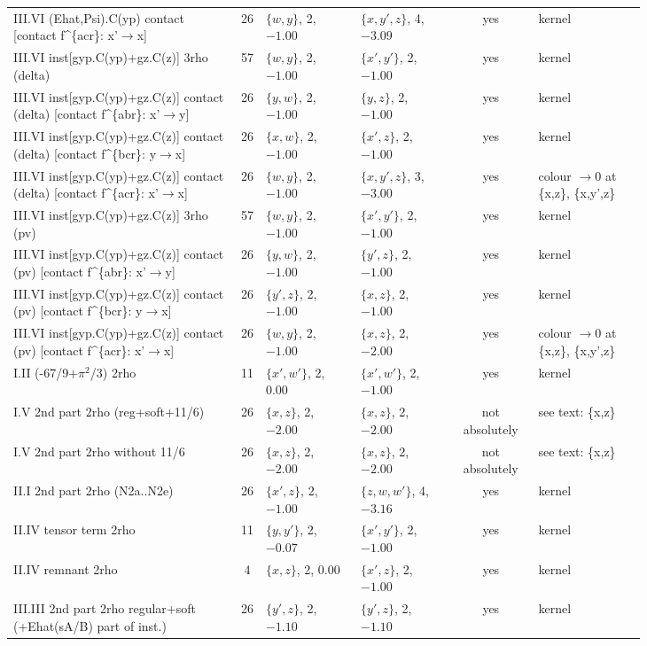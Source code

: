 \documentclass[9pt]{article}
\numberwithin{equation}{section}
\begin{document}
{\begin{center}
\begin{tabular}{|p{0.36\linewidth}|c|p{0.15\linewidth}|p{0.15\linewidth}|c|p{0.17\linewidth}|}
III.VI (Ehat,Psi).C(yp) contact [contact f\^{}\{acr\}: x'$\to$x] & 26 & $\{w,y\}$, 2, $-1.00$ & $\{x,y',z\}$, 4, $-3.09$ & yes & kernel\\
III.VI inst[gyp.C(yp)+gz.C(z)] 3rho (delta) & 57 & $\{w,y\}$, 2, $-1.00$ & $\{x',y'\}$, 2, $-1.00$ & yes & kernel\\
III.VI inst[gyp.C(yp)+gz.C(z)] contact (delta) [contact f\^{}\{abr\}: x'$\to$y] & 26 & $\{y,w\}$, 2, $-1.00$ & $\{y,z\}$, 2, $-1.00$ & yes & kernel\\
III.VI inst[gyp.C(yp)+gz.C(z)] contact (delta) [contact f\^{}\{bcr\}: y$\to$x] & 26 & $\{x,w\}$, 2, $-1.00$ & $\{x',z\}$, 2, $-1.00$ & yes & kernel\\
III.VI inst[gyp.C(yp)+gz.C(z)] contact (delta) [contact f\^{}\{acr\}: x'$\to$x] & 26 & $\{w,y\}$, 2, $-1.00$ & $\{x,y',z\}$, 3, $-3.00$ & yes & colour $\to0$ at \{x,z\}, \{x,y',z\}\\
III.VI inst[gyp.C(yp)+gz.C(z)] 3rho (pv) & 57 & $\{w,y\}$, 2, $-1.00$ & $\{x',y'\}$, 2, $-1.00$ & yes & kernel\\
III.VI inst[gyp.C(yp)+gz.C(z)] contact (pv) [contact f\^{}\{abr\}: x'$\to$y] & 26 & $\{y,w\}$, 2, $-1.00$ & $\{y',z\}$, 2, $-1.00$ & yes & kernel\\
III.VI inst[gyp.C(yp)+gz.C(z)] contact (pv) [contact f\^{}\{bcr\}: y$\to$x] & 26 & $\{y',z\}$, 2, $-1.00$ & $\{x,z\}$, 2, $-1.00$ & yes & kernel\\
III.VI inst[gyp.C(yp)+gz.C(z)] contact (pv) [contact f\^{}\{acr\}: x'$\to$x] & 26 & $\{w,y\}$, 2, $-1.00$ & $\{x,z\}$, 2, $-2.00$ & yes & colour $\to0$ at \{x,z\}, \{x,y',z\}\\
I.II (-67/9+$\pi^2$/3) 2rho & 11 & $\{x',w'\}$, 2, $0.00$ & $\{x',w'\}$, 2, $-1.00$ & yes & kernel\\
I.V 2nd part 2rho (reg+soft+11/6) & 26 & $\{x,z\}$, 2, $-2.00$ & $\{x,z\}$, 2, $-2.00$ & not absolutely & see text: \{x,z\}\\
I.V 2nd part 2rho without 11/6 & 26 & $\{x,z\}$, 2, $-2.00$ & $\{x,z\}$, 2, $-2.00$ & not absolutely & see text: \{x,z\}\\
II.I 2nd part 2rho (N2a..N2e) & 26 & $\{x',z\}$, 2, $-1.00$ & $\{z,w,w'\}$, 4, $-3.16$ & yes & kernel\\
II.IV tensor term 2rho & 11 & $\{y,y'\}$, 2, $-0.07$ & $\{x',y'\}$, 2, $-1.00$ & yes & kernel\\
II.IV remnant 2rho & 4 & $\{x,z\}$, 2, $0.00$ & $\{x',z\}$, 2, $-1.00$ & yes & kernel\\
III.III 2nd part 2rho regular+soft (+Ehat(sA/B) part of inst.) & 26 & $\{y',z\}$, 2, $-1.10$ & $\{y',z\}$, 2, $-1.10$ & yes & kernel\\

\end{tabular}
\end{center}}
\end{document}
